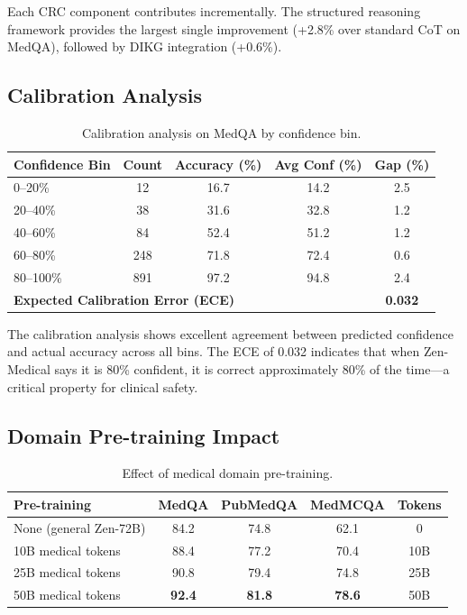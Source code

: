\documentclass[11pt,a4paper]{article}
\begin{document}
Each CRC component contributes incrementally. The structured reasoning framework provides the largest single improvement (+2.8\% over standard CoT on MedQA), followed by DIKG integration (+0.6\%).

\subsection{Calibration Analysis}

\begin{table}[t]
\centering
\caption{Calibration analysis on MedQA by confidence bin.}
\label{tab:calibration}
\begin{tabular}{lcccc}
\toprule
\textbf{Confidence Bin} & \textbf{Count} & \textbf{Accuracy (\%)} & \textbf{Avg Conf (\%)} & \textbf{Gap (\%)} \\
\midrule
0--20\% & 12 & 16.7 & 14.2 & 2.5 \\
20--40\% & 38 & 31.6 & 32.8 & 1.2 \\
40--60\% & 84 & 52.4 & 51.2 & 1.2 \\
60--80\% & 248 & 71.8 & 72.4 & 0.6 \\
80--100\% & 891 & 97.2 & 94.8 & 2.4 \\
\midrule
\multicolumn{4}{l}{\textbf{Expected Calibration Error (ECE)}} & \textbf{0.032} \\
\bottomrule
\end{tabular}
\end{table}

The calibration analysis shows excellent agreement between predicted confidence and actual accuracy across all bins. The ECE of 0.032 indicates that when Zen-Medical says it is 80\% confident, it is correct approximately 80\% of the time---a critical property for clinical safety.

\subsection{Domain Pre-training Impact}

\begin{table}[t]
\centering
\caption{Effect of medical domain pre-training.}
\label{tab:pretraining}
\begin{tabular}{lcccc}
\toprule
\textbf{Pre-training} & \textbf{MedQA} & \textbf{PubMedQA} & \textbf{MedMCQA} & \textbf{Tokens} \\
\midrule
None (general Zen-72B) & 84.2 & 74.8 & 62.1 & 0 \\
10B medical tokens & 88.4 & 77.2 & 70.4 & 10B \\
25B medical tokens & 90.8 & 79.4 & 74.8 & 25B \\
50B medical tokens & \textbf{92.4} & \textbf{81.8} & \textbf{78.6} & 50B \\
\bottomrule
\end{tabular}
\end{table}
\end{document}
